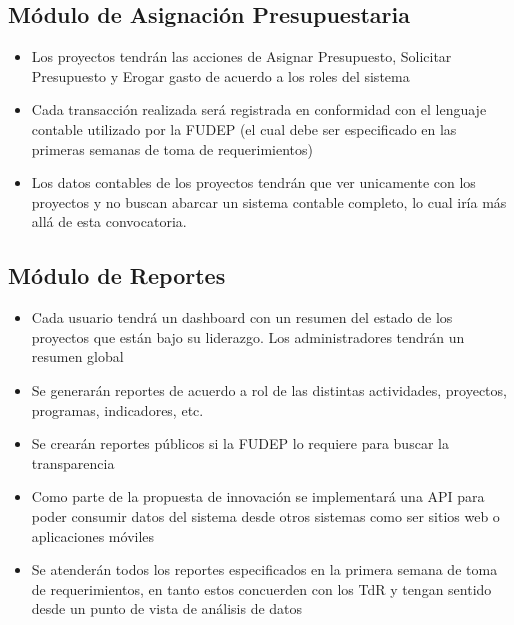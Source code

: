 \subsection{Módulo de Asignación Presupuestaria}
\begin{itemize}
    \item Los proyectos tendrán las acciones de Asignar Presupuesto, Solicitar Presupuesto y Erogar gasto de acuerdo a los roles del sistema
    \item Cada transacción realizada será registrada en conformidad con el lenguaje contable utilizado por la FUDEP (el cual debe ser especificado en las primeras semanas de toma de requerimientos)
    \item Los datos contables de los proyectos tendrán que ver unicamente con los proyectos y no buscan abarcar un sistema contable completo, lo cual iría más allá de esta convocatoria.
\end{itemize}

\subsection{Módulo de Reportes}
\begin{itemize}
    \item Cada usuario tendrá un dashboard con un resumen del estado de los proyectos que están bajo su liderazgo. Los administradores tendrán un resumen global
    \item Se generarán reportes de acuerdo a rol de las distintas actividades, proyectos, programas, indicadores, etc.
    \item Se crearán reportes públicos si la FUDEP lo requiere para buscar la transparencia
    \item Como parte de la propuesta de innovación se implementará una API para poder consumir datos del sistema desde otros sistemas como ser sitios web o aplicaciones móviles
    \item Se atenderán todos los reportes especificados en la primera semana de toma de requerimientos, en tanto estos concuerden con los TdR y tengan sentido desde un punto de vista de análisis de datos
\end{itemize}

